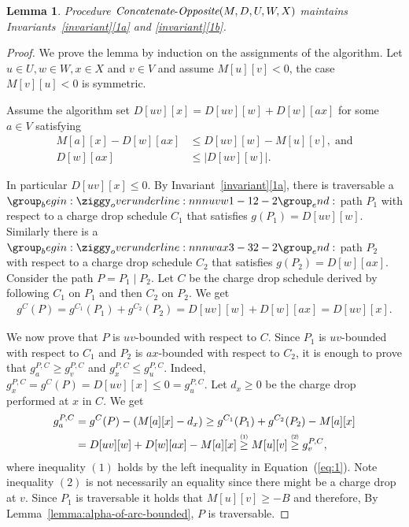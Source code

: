 \documentclass[11pt]{article}
\newtheorem{lemma}[theorem]{Lemma}
\newcommand{\CO}{\mbox{{\it Concatenate}-{\it Opposite}}}
\newcommand\numge[1]{\stackrel{\scriptscriptstyle(\mkern-1.5mu#1\mkern-1.5mu)}{\ge}}
\begin{document}
\begin{lemma}\label{lemma:concat-opposite-invariant}
    Procedure $\CO(M,D,U,W,X)$ maintains Invariants~\ref{invariant}\ref{1a} and \ref{invariant}\ref{1b}.
\end{lemma}

\begin{proof}
    We prove the lemma by induction on the assignments of the algorithm. Let $u\in U,w\in W,x\in X$ and $v\in V$ and assume $M[u][v]<0$, the case $M[v][u]<0$ is symmetric.
    
    Assume the algorithm set $D[uv][x] = D[uv][w]+ D[w][ax]$ for some $a\in V$ satisfying
    \begin{align}\label{eq:1}
     M[a][x]-D[w][ax] &\le D[uv][w]-M[u][v], \; \text{and} \\
     D[w][ax] &\le |D[uv][w]|.
    \end{align}
    
    In particular $D[uv][x]\le 0$.
    By Invariant~\ref{invariant}\ref{1a}, there is traversable a $\overunderline{uvw}{1-1}{2-2}$ path $P_1$ with respect to a charge drop schedule $C_1$ that satisfies $g(P_1) = D[uv][w]$. Similarly there is a $\overunderline{wax}{3-3}{2-2}$ path $P_2$ with respect to a charge drop schedule $C_2$ that satisfies $g(P_2) = D[w][ax]$. Consider the path $P = P_1\mid P_2$.  Let $C$ be the charge drop schedule derived by following $C_1$ on $P_1$ and then $C_2$ on $P_2$. We get 
    \begin{align*}
        g^{C}(P) = g^{C_1}(P_1) + g^{C_2}(P_2) = D[uv][w]+D[w][ax] = D[uv][x].
    \end{align*}

    We now prove that $P$ is $uv$-bounded with respect to $C$.  
    Since $P_1$ is $uv$-bounded with respect to $C_1$ and $P_2$ is $ax$-bounded with respect to $C_2$, it is enough to prove that $g^{P,C}_a \ge g^{P,C}_v$ and $g^{P,C}_x\le g^{P,C}_u$. Indeed, $g^{P,C}_x = g^C(P)= D[uv][x] \le 0 = g^{P,C}_u$. Let $d_x\ge 0$ be the charge drop performed at $x$ in $C$. We get
    \begin{align*}
        g^{P,C}_a 
        &= g^C(P)-(M[a][x]-d_x)
        \ge g^{C_1}(P_1) + g^{C_2}(P_2) - M[a][x] \\
        &= D[uv][w] + D[w][ax] - M[a][x]
        \numge{1} M[u][v] 
        \numge{2} g^{P,C}_v,
    \end{align*}
    where inequality $(1)$ holds by the left inequality in Equation~(\ref{eq:1}). Note inequality $(2)$ is not necessarily an equality since there might be a charge drop at $v$. Since $P_1$ is traversable it holds that $M[u][v]\ge -B$ and therefore, By Lemma~\ref{lemma:alpha-of-arc-bounded}, $P$ is traversable.


\end{proof}
\end{document}
